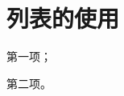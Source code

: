 \section{列表的使用}

\begin{asparaenum}[(1)]
    \item 第一项；
    \item 第二项。
\end{asparaenum}


\let\cleardoublepage\clearpage



